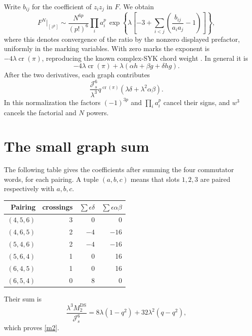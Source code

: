 \documentclass[11pt,a4paper]{article}
\newcommand{\Js}{\mathcal J_s}
\begin{document}
Write $b_{ij}$ for the coefficient of $z_i z_j$ in $F$. We obtain
\begin{equation}
 F^N\big|_{[z^p]}
 \sim\frac{N^{6p}}{(p!)^6}\prod_i a_i^p\,
 \exp\!\left\{\lambda\left[-3+
           \sum_{i<j}\left(\frac{b_{ij}}{a_i a_j}-1\right)\right]\right\},
\end{equation}
where this denotes convergence of the ratio by the nonzero displayed
prefactor, uniformly in the marking variables. With zero marks the
exponent is $-4\lambda\operatorname{cr}(\pi)$, reproducing the known
complex-SYK chord weight \cite{bnr}. In general it is
\begin{equation}
 -4\lambda\operatorname{cr}(\pi)+\lambda(\alpha h+\beta g+\delta hg).
\end{equation}
After the two derivatives, each graph contributes
\begin{equation}
 \frac{\Js^6}{\lambda^3}
 q^{\operatorname{cr}(\pi)}(\lambda\delta+\lambda^2\alpha\beta).
\end{equation}
In this normalization the factors $(-1)^{3p}$ and $\prod_i a_i^p$
cancel their signs, and $w^3$ cancels the factorial and $N$ powers.

\newpage
\section{The small graph sum}
The following table gives the coefficients after summing the four
commutator words, for each pairing. A tuple $(a,b,c)$ means that slots
$1,2,3$ are paired respectively with $a,b,c$.
\begin{center}
\begin{tabular}{rrrr}\toprule
Pairing & crossings & $\sum\epsilon\delta$
                         & $\sum\epsilon\alpha\beta$\\\midrule
$(4,5,6)$ & 3 & 0 & 0\\
$(4,6,5)$ & 2 & $-4$ & $-16$\\
$(5,4,6)$ & 2 & $-4$ & $-16$\\
$(5,6,4)$ & 1 & 0 & 16\\
$(6,4,5)$ & 1 & 0 & 16\\
$(6,5,4)$ & 0 & 8 & 0\\\bottomrule
\end{tabular}
\end{center}
Their sum is
\begin{equation}
 \frac{\lambda^3 M_2^{\mathrm{DS}}}{\Js^6}
 =8\lambda(1-q^2)+32\lambda^2(q-q^2),
\end{equation}
which proves \eqref{m2}.
\end{document}
